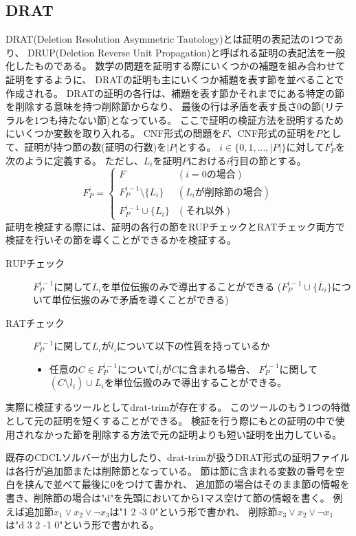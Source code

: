 \documentclass[titlepage]{jsarticle}
\begin{document}
\subsection{DRAT}
DRAT(Deletion Resolution Asymmetric Tautology)とは証明の表記法の1つであり、
DRUP(Deletion Reverse Unit Propagation)と呼ばれる証明の表記法を一般化したものである。
数学の問題を証明する際にいくつかの補題を組み合わせて証明をするように、
DRATの証明も主にいくつか補題を表す節を並べることで作成される。
DRATの証明の各行は、補題を表す節かそれまでにある特定の節を削除する意味を持つ削除節からなり、
最後の行は矛盾を表す長さ0の節(リテラルを1つも持たない節)となっている。
ここで証明の検証方法を説明するためにいくつか変数を取り入れる。
CNF形式の問題を$F$、CNF形式の証明を$P$として、証明が持つ節の数(証明の行数)を$|P|$とする。
$i \in \{0,1,...,|P|\}$に対して$F_{P}^{i}$を次のように定義する。
ただし、$L_i$を証明$P$における$i$行目の節とする。
\[
	F_{P}^{i} = 
	\begin{cases}
		F                           & (i=0{の場合}) \\
		F_{P}^{i-1} \setminus \{L_i\} & (L_i{が削除節の場合}) \\
		F_{P}^{i-1} \cup      \{L_i\} & ({それ以外}) 
	\end{cases}
\]
証明を検証する際には、証明の各行の節をRUPチェックとRATチェック両方で検証を行いその節を導くことができるかを検証する。
\begin{description}
	\item[RUPチェック] $F_{P}^{i-1}$に関して$L_i$を単位伝搬のみで導出することができる
		($F_{P}^{i-1} \cup \{\overline L_i\}$について単位伝搬のみで矛盾を導くことができる)
	\item[RATチェック] $F_{P}^{i-1}$に関して$L_i$が$l_i$について以下の性質を持っているか \\
		\begin{itemize}
			\item 任意の$C \in F_{P}^{i-1}$について$\overline l_i$が$C$に含まれる場合、
				$F_{P}^{i-1}$に関して$(C \setminus {\overline l_i}) \cup L_i$を単位伝搬のみで導出することができる。
		\end{itemize}
\end{description}

実際に検証するツールとしてdrat-trimが存在する。
このツールのもう1つの特徴として元の証明を短くすることができる。
検証を行う際にもとの証明の中で使用されなかった節を削除する方法で元の証明よりも短い証明を出力している。

既存のCDCLソルバーが出力したり、drat-trimが扱うDRAT形式の証明ファイルは各行が追加節または削除節となっている。
節は節に含まれる変数の番号を空白を挟んで並べて最後に0をつけて書かれ、
追加節の場合はそのまま節の情報を書き、削除節の場合は"d"を先頭においてから1マス空けて節の情報を書く。
例えば追加節$x_1 \lor x_2 \lor \neg x_3$は"1 2 -3 0"という形で書かれ、
削除節$x_3 \lor x_2 \lor \neg x_1$は"d 3 2 -1 0"という形で書かれる。
\end{document}
